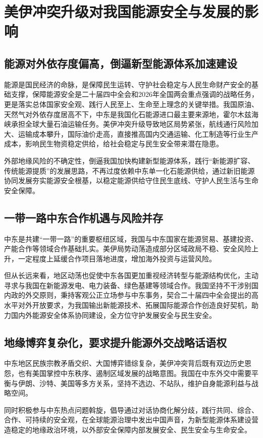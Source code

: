 \documentclass[12pt,a4paper,UTF8]{article}
\begin{document}
\section{美伊冲突升级对我国能源安全与发展的影响}
\subsection{能源对外依存度偏高，倒逼新型能源体系加速建设}
能源是国民经济的命脉，是保障民生运转、守护社会稳定与人民生命财产安全的基础支撑，保障能源安全是二十届四中全会和2026年全国两会重点强调的战略任务，更是落实总体国家安全观、践行人民至上、生命至上理念的关键举措。我国原油、天然气对外依存度居高不下，中东是我国化石能源进口最主要来源地，霍尔木兹海峡承担全球大量石油运输任务。美伊冲突升级导致地区局势紧张，航线通行风险加大、运输成本攀升，国际油价走高，直接推高国内交通运输、化工制造等行业生产成本，影响民生物资稳定供给，给社会稳定与民生安全带来潜在隐患。

外部地缘风险的不确定性，倒逼我国加快构建新型能源体系，践行“新能源扩容、传统能源提质”的发展思路，不再过度依赖中东单一化石能源供给，通过新旧能源协同发展夯实能源安全根基，以稳定能源供给守住民生底线、守护人民生活与生命安全保障。

\subsection{一带一路中东合作机遇与风险并存}
中东是共建“一带一路”的重要枢纽区域，我国与中东国家在能源贸易、基建投资、产能合作等领域合作基础扎实。美伊局势动荡造成部分区域政局不稳、安全风险上升，一定程度上延缓合作项目落地进度，增加海外投资与运营风险。

但从长远来看，地区动荡也促使中东各国更加重视经济转型与能源结构优化，主动寻求与我国在新能源发电、电力装备、绿色基建等领域合作。我国坚持不干涉别国内政的外交原则，秉持客观公正立场参与中东事务，契合二十届四中全会提出的高水平对外开放要求，为我国输出新能源技术、拓展国际能源合作创造良好契机，助力国内外能源安全体系协同建设，全方位守护发展安全与民生安全。

\subsection{地缘博弈复杂化，要求提升能源外交战略话语权}
中东地区民族宗教矛盾交织、大国博弈错综复杂，美伊冲突背后既有双边历史恩怨，也有美国掌控中东秩序、遏制区域发展的战略意图。我国在中东外交中需要平衡与伊朗、沙特、美国等多方关系，坚持不选边、不站队，维护自身能源利益与战略空间。

同时积极参与中东热点问题斡旋，倡导通过对话协商化解分歧，践行共同、综合、合作、可持续的安全观，在全球能源治理中发出中国声音，为新型能源体系建设营造稳定的地缘政治环境，以外部安全保障内部发展安全、民生安全与生命安全。
\end{document}
